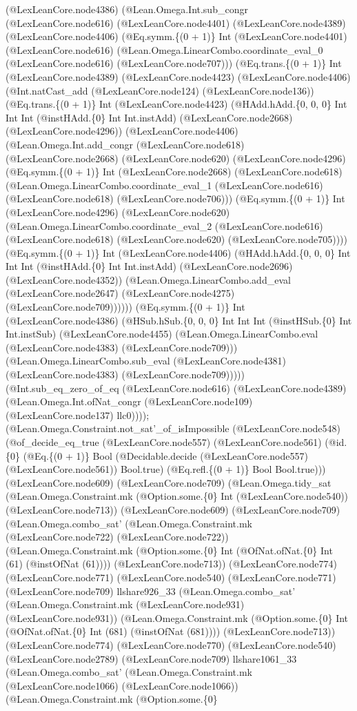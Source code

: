 \documentclass[11pt]{article}
\begin{document}
(@LexLeanCore.node4386) (@Lean.Omega.Int.sub\_congr (@LexLeanCore.node616) (@LexLeanCore.node4401) (@LexLeanCore.node4389) (@LexLeanCore.node4406) (@Eq.symm.\{(0 + 1)\} Int (@LexLeanCore.node4401) (@LexLeanCore.node616) (@Lean.Omega.LinearCombo.coordinate\_eval\_0 (@LexLeanCore.node616) (@LexLeanCore.node707))) (@Eq.trans.\{(0 + 1)\} Int (@LexLeanCore.node4389) (@LexLeanCore.node4423) (@LexLeanCore.node4406) (@Int.natCast\_add (@LexLeanCore.node124) (@LexLeanCore.node136)) (@Eq.trans.\{(0 + 1)\} Int (@LexLeanCore.node4423) (@HAdd.hAdd.\{0, 0, 0\} Int Int Int (@instHAdd.\{0\} Int Int.instAdd) (@LexLeanCore.node2668) (@LexLeanCore.node4296)) (@LexLeanCore.node4406) (@Lean.Omega.Int.add\_congr (@LexLeanCore.node618) (@LexLeanCore.node2668) (@LexLeanCore.node620) (@LexLeanCore.node4296) (@Eq.symm.\{(0 + 1)\} Int (@LexLeanCore.node2668) (@LexLeanCore.node618) (@Lean.Omega.LinearCombo.coordinate\_eval\_1 (@LexLeanCore.node616) (@LexLeanCore.node618) (@LexLeanCore.node706))) (@Eq.symm.\{(0 + 1)\} Int (@LexLeanCore.node4296) (@LexLeanCore.node620) (@Lean.Omega.LinearCombo.coordinate\_eval\_2 (@LexLeanCore.node616) (@LexLeanCore.node618) (@LexLeanCore.node620) (@LexLeanCore.node705)))) (@Eq.symm.\{(0 + 1)\} Int (@LexLeanCore.node4406) (@HAdd.hAdd.\{0, 0, 0\} Int Int Int (@instHAdd.\{0\} Int Int.instAdd) (@LexLeanCore.node2696) (@LexLeanCore.node4352)) (@Lean.Omega.LinearCombo.add\_eval (@LexLeanCore.node2647) (@LexLeanCore.node4275) (@LexLeanCore.node709)))))) (@Eq.symm.\{(0 + 1)\} Int (@LexLeanCore.node4386) (@HSub.hSub.\{0, 0, 0\} Int Int Int (@instHSub.\{0\} Int Int.instSub) (@LexLeanCore.node4455) (@Lean.Omega.LinearCombo.eval (@LexLeanCore.node4383) (@LexLeanCore.node709))) (@Lean.Omega.LinearCombo.sub\_eval (@LexLeanCore.node4381) (@LexLeanCore.node4383) (@LexLeanCore.node709))))) (@Int.sub\_eq\_zero\_of\_eq (@LexLeanCore.node616) (@LexLeanCore.node4389) (@Lean.Omega.Int.ofNat\_congr (@LexLeanCore.node109) (@LexLeanCore.node137) llc0)))); (@Lean.Omega.Constraint.not\_sat'\_of\_isImpossible (@LexLeanCore.node548) (@of\_decide\_eq\_true (@LexLeanCore.node557) (@LexLeanCore.node561) (@id.\{0\} (@Eq.\{(0 + 1)\} Bool (@Decidable.decide (@LexLeanCore.node557) (@LexLeanCore.node561)) Bool.true) (@Eq.refl.\{(0 + 1)\} Bool Bool.true))) (@LexLeanCore.node609) (@LexLeanCore.node709) (@Lean.Omega.tidy\_sat (@Lean.Omega.Constraint.mk (@Option.some.\{0\} Int (@LexLeanCore.node540)) (@LexLeanCore.node713)) (@LexLeanCore.node609) (@LexLeanCore.node709) (@Lean.Omega.combo\_sat' (@Lean.Omega.Constraint.mk (@LexLeanCore.node722) (@LexLeanCore.node722)) (@Lean.Omega.Constraint.mk (@Option.some.\{0\} Int (@OfNat.ofNat.\{0\} Int (61) (@instOfNat (61)))) (@LexLeanCore.node713)) (@LexLeanCore.node774) (@LexLeanCore.node771) (@LexLeanCore.node540) (@LexLeanCore.node771) (@LexLeanCore.node709) llshare926\_33 (@Lean.Omega.combo\_sat' (@Lean.Omega.Constraint.mk (@LexLeanCore.node931) (@LexLeanCore.node931)) (@Lean.Omega.Constraint.mk (@Option.some.\{0\} Int (@OfNat.ofNat.\{0\} Int (681) (@instOfNat (681)))) (@LexLeanCore.node713)) (@LexLeanCore.node774) (@LexLeanCore.node770) (@LexLeanCore.node540) (@LexLeanCore.node2789) (@LexLeanCore.node709) llshare1061\_33 (@Lean.Omega.combo\_sat' (@Lean.Omega.Constraint.mk (@LexLeanCore.node1066) (@LexLeanCore.node1066)) (@Lean.Omega.Constraint.mk (@Option.some.\{0\} 
\end{document}
